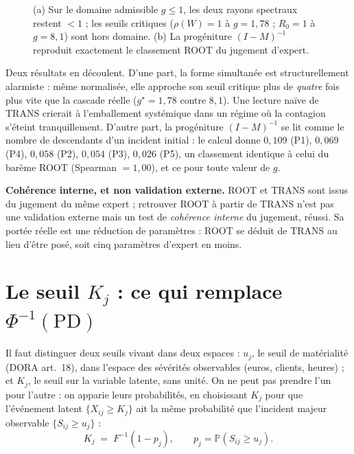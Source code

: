 \begin{figure}[htbp]\centering
{}
\caption{(a) Sur le domaine admissible $g\le1$, les deux rayons spectraux restent $<1$ ; les
seuils critiques ($\rho(W)=1$ à $g=1{,}78$ ; $R_0=1$ à $g=8{,}1$) sont hors domaine. (b) La
progéniture $(I-M)^{-1}$ reproduit exactement le classement ROOT du jugement d'expert.}
\end{figure}

Deux résultats en découlent. D'une part, la forme simultanée est structurellement
alarmiste : même normalisée, elle approche son seuil critique plus de \emph{quatre} fois plus
vite que la cascade réelle ($g^\star=1{,}78$ contre $8{,}1$). Une lecture naïve de TRANS crierait à
l'emballement systémique dans un régime où la contagion s'éteint tranquillement. D'autre part,
la progéniture $(I-M)^{-1}$ se lit comme le nombre de descendants d'un incident initial : le
calcul donne $0{,}109$ (P1), $0{,}069$ (P4), $0{,}058$ (P2), $0{,}054$ (P3), $0{,}026$ (P5), un
classement identique à celui du barème ROOT (Spearman $=1{,}00$), et ce pour toute
valeur de $g$.

\begin{attention}
\textbf{Cohérence interne, et non validation externe.} ROOT et TRANS sont issus du jugement du
même expert ; retrouver ROOT à partir de TRANS n'est pas une validation externe mais un test de
\emph{cohérence interne} du jugement, réussi. Sa portée réelle est une réduction de
paramètres : ROOT se déduit de TRANS au lieu d'être posé, soit cinq paramètres d'expert en
moins.
\end{attention}


\section{Le seuil $K_j$ : ce qui remplace $\Phi^{-1}(\mathrm{PD})$}

Il faut distinguer deux seuils vivant dans deux espaces : $u_j$, le seuil de matérialité
(DORA art.~18), dans l'espace des sévérités observables (euros, clients, heures) ; et $K_j$, le
seuil sur la variable latente, sans unité. On ne peut pas prendre l'un pour l'autre : on
apparie leurs probabilités, en choisissant $K_j$ pour que l'événement latent
$\{X_{ij}\ge K_j\}$ ait la même probabilité que l'incident majeur observable
$\{S_{ij}\ge u_j\}$ :
\begin{equation}
\label{eq:Kj}
\boxed{\;K_j\;=\;F^{-1}(1-p_j), \qquad p_j=\mathbb P(S_{ij}\ge u_j).\;}
\end{equation}

